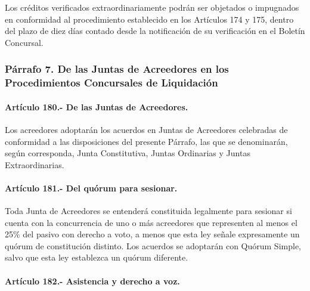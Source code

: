 \documentclass[
]{book}
\begin{document}
Los créditos verificados extraordinariamente podrán ser objetados o impugnados en conformidad al procedimiento establecido en los Artículos 174 y 175, dentro del plazo de diez días contado desde la notificación de su verificación en el Boletín Concursal.

\hypertarget{puxe1rrafo-7.-de-las-juntas-de-acreedores-en-los-procedimientos-concursales-de-liquidaciuxf3n}{%
\subsubsection*{Párrafo 7. De las Juntas de Acreedores en los Procedimientos Concursales de Liquidación}\label{puxe1rrafo-7.-de-las-juntas-de-acreedores-en-los-procedimientos-concursales-de-liquidaciuxf3n}}

\hypertarget{artuxedculo-180.--de-las-juntas-de-acreedores.}{%
\paragraph*{Artículo 180.- De las Juntas de Acreedores.}\label{artuxedculo-180.--de-las-juntas-de-acreedores.}}

Los acreedores adoptarán los acuerdos en Juntas de Acreedores celebradas de conformidad a las disposiciones del presente Párrafo, las que se denominarán, según corresponda, Junta Constitutiva, Juntas Ordinarias y Juntas Extraordinarias.

\hypertarget{artuxedculo-181.--del-quuxf3rum-para-sesionar.}{%
\paragraph*{Artículo 181.- Del quórum para sesionar.}\label{artuxedculo-181.--del-quuxf3rum-para-sesionar.}}

Toda Junta de Acreedores se entenderá constituida legalmente para sesionar si cuenta con la concurrencia de uno o más acreedores que representen al menos el 25\% del pasivo con derecho a voto, a menos que esta ley señale expresamente un quórum de constitución distinto. Los acuerdos se adoptarán con Quórum Simple, salvo que esta ley establezca un quórum diferente.

\hypertarget{artuxedculo-182.--asistencia-y-derecho-a-voz.}{%
\paragraph*{Artículo 182.- Asistencia y derecho a voz.}\label{artuxedculo-182.--asistencia-y-derecho-a-voz.}}
\end{document}
